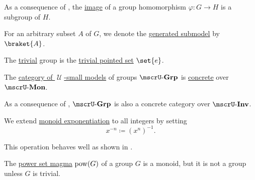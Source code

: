 \begin{definition}
\begin{thmenum}
    As a consequence of , the \hyperref[def:multi_valued_function/image]{image} of a group homomorphism \( \varphi: G \to H \) is a subgroup of \( H \).

    For an arbitrary subset \( A \) of \( G \), we denote the \hyperref[def:first_order_generated_substructure]{generated submodel} by \( \braket{ A } \).

      The \hyperref[thm:substructures_form_complete_lattice/bottom]{trivial} group is the \hyperref[def:pointed_set/trivial]{trivial pointed set} \( \set{ e } \).

     The \hyperref[def:category_of_small_first_order_models]{category of \( \mscrU \)-small models} of groups \( \ucat{Grp} \) is \hyperref[def:concrete_category]{concrete} over \hyperref[def:monoid]{\( \ucat{Mon} \)}.

    As a consequence of , \( \ucat{Grp} \) is also a concrete category over \( \ucat{Inv} \).

     We extend \hyperref[def:monoid/exponentiation]{monoid exponentiation} to all integers by setting
    \begin{equation*}
      x^{-n} \coloneqq (x^n)^{-1}.
    \end{equation*}

    This operation behaves well as shown in .
  \end{thmenum}
\end{definition}

\begin{example}\label{ex:power_set_is_not_a_group}
  The \hyperref[def:magma/power_set]{power set magma} \( \operatorname{pow}(G) \) of a group \( G \) is a monoid, but it is not a group unless \( G \) is trivial.
\end{example}

